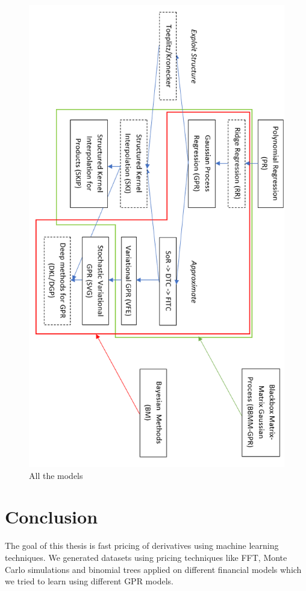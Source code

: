 \documentclass[12pt,a4paper,oneside]{book}
\begin{document}
\clearpage

\begin{figure}[!htb]
     \centering
     \includegraphics[width=0.8\linewidth]{scheme_thesis}
     \caption{All the models}\label{fig:summary}
\end{figure}

\clearpage

\section{Conclusion}

The goal of this thesis is fast pricing of derivatives using machine learning techniques. We generated datasets using pricing techniques like FFT, Monte Carlo simulations and binomial trees applied on different financial models which we tried to learn using different GPR models.
\end{document}
